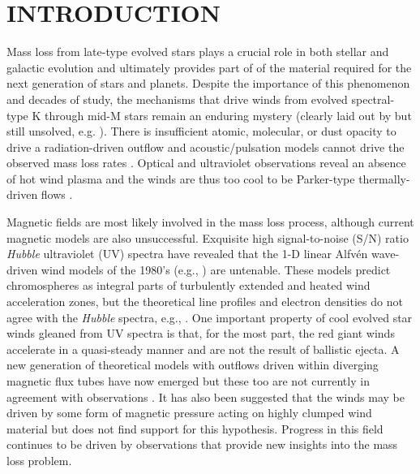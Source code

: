 \documentclass[iop]{emulateapj}
\begin{document}

\section{INTRODUCTION}

Mass loss from late-type evolved stars plays a crucial role in both stellar and galactic evolution and ultimately provides part of of the material required for the next generation of stars and planets. Despite the importance of this phenomenon and decades of study, the mechanisms that drive winds from evolved spectral-type K through mid-M stars remain an enduring mystery (clearly laid out by \cite{1985ASSL..117..229H} but still unsolved, e.g.
\citealt{2009AIPC.1094..267C}). There is insufficient atomic, molecular, or dust opacity to drive a radiation-driven outflow and acoustic/pulsation models cannot drive the observed mass loss rates \citep{1995ApJ...442L..61S}. Optical and ultraviolet observations reveal an absence of hot wind plasma and the winds are thus too cool to be Parker-type thermally-driven flows \cite[e.g.][]{1979ApJ...229L..27L,1981ApJ...250..293A}. 

Magnetic fields are most likely involved in the mass loss process, although current magnetic models are also unsuccessful. Exquisite high signal-to-noise (S/N) ratio \textit{Hubble} ultraviolet (UV) spectra have revealed that the 1-D linear Alfv\'en wave-driven wind models of the 1980’s (e.g., \citealt{1980ApJ...242..260H}) are untenable. These models predict chromospheres as integral parts of turbulently extended and heated wind acceleration zones, but the theoretical line profiles and electron densities do not agree with the \textit{Hubble} spectra, e.g., \cite{1998ApJ...494..828J}. One important property of cool evolved star winds gleaned from UV spectra is that, for the most part, the red giant winds accelerate in a quasi-steady manner and are not the result of ballistic ejecta. A new generation of theoretical models with outflows driven within diverging magnetic flux tubes have now emerged \citep{2006MNRAS.368.1145F, 2007ApJ...659.1592S} but these too are not currently in agreement with observations \citep{2009AIPC.1094..267C}. It has also been suggested that the winds may be driven by some form of magnetic pressure acting on highly clumped wind material \citep{2008AJ....136.1964E} but \cite{2010ApJ...720.1767H} does not find support for this hypothesis. Progress in this field continues to be driven by observations that provide new insights into the mass loss problem.
\end{document}
